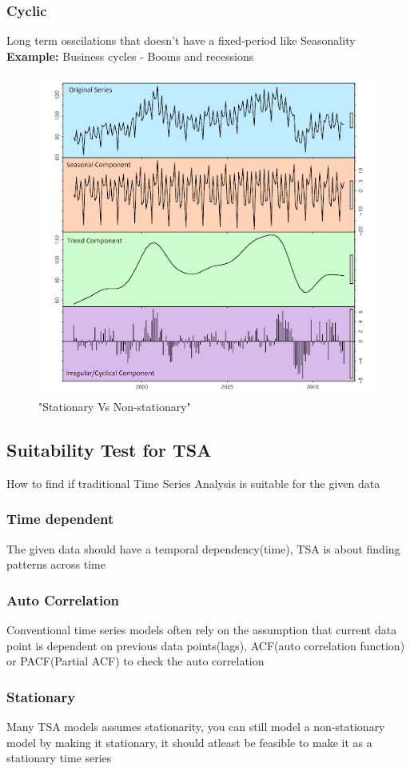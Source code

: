 \documentclass[12pt]{extarticle}
\begin{document}
\subsubsection{Cyclic}
Long term osscilations that doesn't have a fixed-period like Seasonality \\
\textbf{Example:} Business cycles - Booms and recessions 

\begin{figure}[H]
    \centering
    \includegraphics[width=0.5\linewidth]{images/timeseries2.png}
    \caption{"Stationary Vs Non-stationary"}
    \label{fig:enter-label}
\end{figure}

\subsection{Suitability Test for TSA}
How to find if traditional Time Series Analysis is suitable for the 
given data
\subsubsection{Time dependent}
The given data should have a temporal dependency(time), TSA is about
finding patterns across time

\subsubsection{Auto Correlation}
Conventional time series models often rely on the assumption that current 
data point is dependent on previous data points(lags), ACF(auto correlation function) 
or PACF(Partial ACF) to check the auto correlation

\subsubsection{Stationary}
Many TSA models assumes stationarity, you can still model a non-stationary model
by making it stationary, it should atleast be feasible to make it as a stationary
time series
\end{document}

